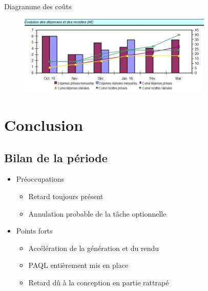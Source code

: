 \documentclass[xcolor=dvipsnames]{beamer}
\begin{document}
\begin{frame}{Diagramme des co\^uts}
	\begin{figure}
		\includegraphics[height=3.8cm]{Images/CourbeCout.png} %
	\end{figure}
\end{frame}




\section{Conclusion}

	\subsection{Bilan de la p\'eriode}
	\begin{frame}{\subsecname}
		\begin{itemize}
			\item Pr\'eoccupations
			\begin{itemize}
				\item Retard toujours pr\'esent
				\item Annulation probable de la t\^ache optionnelle
			\end{itemize}
		\end{itemize}
		\begin{itemize}
			\item Points forts
			\begin{itemize}
				\item Acc\'el\'eration de la g\'en\'eration et du rendu
				\item PAQL enti\`erement mis en place
				\item Retard d\^u \`a la conception en partie rattrap\'e
			\end{itemize}
		\end{itemize}
	\end{frame}
\end{document}
